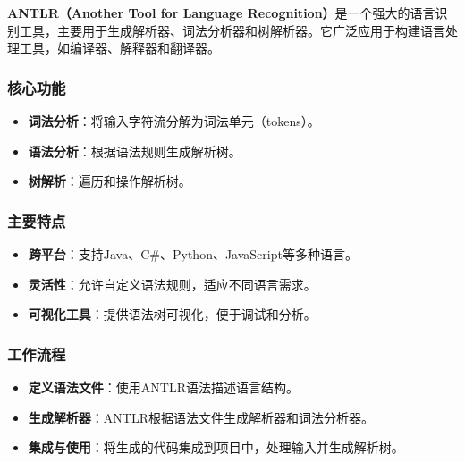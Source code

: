 
\textbf{ANTLR（Another Tool for Language Recognition）}是一个强大的语言识别工具，主要用于生成解析器、词法分析器和树解析器。它广泛应用于构建语言处理工具，如编译器、解释器和翻译器。

\subsubsection{核心功能}
\begin{itemize}
\item \textbf{\textbf{词法分析}}：将输入字符流分解为词法单元（tokens）。
\item \textbf{语法分析}：根据语法规则生成解析树。
\item \textbf{树解析}：遍历和操作解析树。
\end{itemize}

\subsubsection{主要特点}
\begin{itemize}
\item \textbf{\textbf{跨平台}}：支持Java、C#、Python、JavaScript等多种语言。
\item \textbf{灵活性}：允许自定义语法规则，适应不同语言需求。
\item \textbf{可视化工具}：提供语法树可视化，便于调试和分析。
\end{itemize}

\subsubsection{工作流程}
\begin{itemize}
\item \textbf{定义语法文件}：使用ANTLR语法描述语言结构。
\item \textbf{生成解析器}：ANTLR根据语法文件生成解析器和词法分析器。
\item \textbf{集成与使用}：将生成的代码集成到项目中，处理输入并生成解析树。
\end{itemize}
